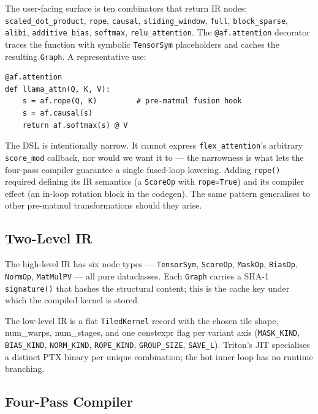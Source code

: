 \documentclass[10pt,twocolumn]{article}
\begin{document}
The user-facing surface is ten combinators that return IR nodes:
\texttt{scaled\_dot\_product}, \texttt{rope}, \texttt{causal},
\texttt{sliding\_window}, \texttt{full}, \texttt{block\_sparse},
\texttt{alibi}, \texttt{additive\_bias}, \texttt{softmax},
\texttt{relu\_attention}. The \texttt{@af.attention} decorator
traces the function with symbolic \texttt{TensorSym} placeholders
and caches the resulting \texttt{Graph}. A representative use:

\begin{lstlisting}
@af.attention
def llama_attn(Q, K, V):
    s = af.rope(Q, K)         # pre-matmul fusion hook
    s = af.causal(s)
    return af.softmax(s) @ V
\end{lstlisting}

The DSL is intentionally narrow. It cannot express
\texttt{flex\_attention}'s arbitrary \texttt{score\_mod} callback,
nor would we want it to --- the narrowness is what lets the four-pass
compiler guarantee a single fused-loop lowering. Adding
\texttt{rope()} required defining its IR semantics (a
\texttt{ScoreOp} with \texttt{rope=True}) and its compiler effect
(an in-loop rotation block in the codegen). The same pattern
generalises to other pre-matmul transformations should they arise.

\subsection{Two-Level IR}
\label{sec:ir}

The high-level IR has six node types ---
\texttt{TensorSym}, \texttt{ScoreOp}, \texttt{MaskOp},
\texttt{BiasOp}, \texttt{NormOp}, \texttt{MatMulPV} --- all pure
dataclasses. Each \texttt{Graph} carries a SHA-1
\texttt{signature()} that hashes the structural content; this is
the cache key under which the compiled kernel is stored.

The low-level IR is a flat \texttt{TiledKernel} record with the
chosen tile shape, num\_warps, num\_stages, and one constexpr flag
per variant axis (\texttt{MASK\_KIND}, \texttt{BIAS\_KIND},
\texttt{NORM\_KIND}, \texttt{ROPE\_KIND},
\texttt{GROUP\_SIZE}, \texttt{SAVE\_L}). Triton's JIT specialises a
distinct PTX binary per unique combination; the hot inner loop has
no runtime branching.

\subsection{Four-Pass Compiler}
\label{sec:compiler}
\end{document}
